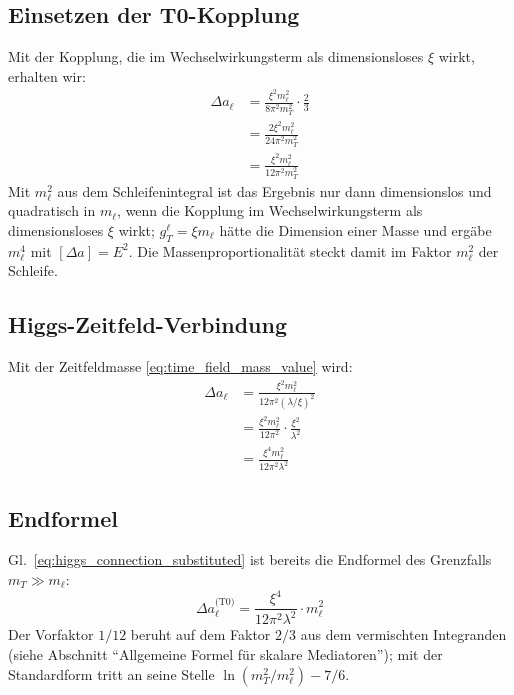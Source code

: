 	\subsection{Einsetzen der T0-Kopplung}
	
	Mit der Kopplung, die im Wechselwirkungsterm als dimensionsloses $\xi$ wirkt, erhalten wir:
	\begin{equation}
		\begin{split}
			\Delta a_\ell &= \frac{\xi^2 m_\ell^2}{8\pi^2 m_T^2} \cdot \frac{2}{3} \\
			&= \frac{2 \xi^2 m_\ell^2}{24\pi^2 m_T^2} \\
			&= \frac{\xi^2 m_\ell^2}{12\pi^2 m_T^2}
		\end{split}
		\label{eq:t0_coupling_inserted}
	\end{equation}
	Mit $m_\ell^2$ aus dem Schleifenintegral ist das Ergebnis nur dann dimensionslos und quadratisch in $m_\ell$, wenn die Kopplung im Wechselwirkungsterm als dimensionsloses $\xi$ wirkt; $g_T^\ell = \xi m_\ell$ hätte die Dimension einer Masse und ergäbe $m_\ell^4$ mit $[\Delta a] = E^2$. Die Massenproportionalität steckt damit im Faktor $m_\ell^2$ der Schleife.
	
	\subsection{Higgs-Zeitfeld-Verbindung}
	
	Mit der Zeitfeldmasse \eqref{eq:time_field_mass_value} wird:
	\begin{equation}
		\begin{split}
			\Delta a_\ell &= \frac{\xi^2 m_\ell^2}{12\pi^2 (\lambda/\xi)^2} \\
			&= \frac{\xi^2 m_\ell^2}{12\pi^2} \cdot \frac{\xi^2}{\lambda^2} \\
			&= \frac{\xi^4 m_\ell^2}{12\pi^2 \lambda^2}
		\end{split}
		\label{eq:higgs_connection_substituted}
	\end{equation}
	
	\subsection{Endformel}

	Gl.~\eqref{eq:higgs_connection_substituted} ist bereits die Endformel des Grenzfalls $m_T \gg m_\ell$:
	\begin{equation}
		\boxed{\Delta a_\ell^{\text{(T0)}} = \frac{\xi^4}{12\pi^2\lambda^2} \cdot m_\ell^2}
		\label{eq:t0_fundamental_formula}
	\end{equation}
	Der Vorfaktor $1/12$ beruht auf dem Faktor $2/3$ aus dem vermischten Integranden (siehe Abschnitt \enquote{Allgemeine Formel für skalare Mediatoren}); mit der Standardform tritt an seine Stelle $\ln(m_T^2/m_\ell^2) - 7/6$.

